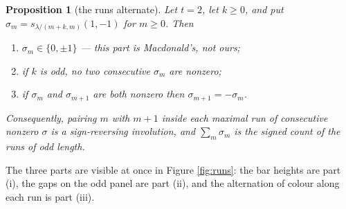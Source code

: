 \documentclass[11pt,reqno]{amsart}
\theoremstyle{plain}
\newtheorem{proposition}[theorem]{Proposition}
\theoremstyle{definition}
\begin{document}
\begin{proposition}[the runs alternate]\label{rem:involution}
Let $t=2$, let $k\ge0$, and put $\sigma_m=s_{\lambda/(m+k,m)}(1,-1)$ for $m\ge0$. Then
\begin{enumerate}
\item[\rm(i)] $\sigma_m\in\{0,\pm1\}$ --- this part is Macdonald's, not ours;
\item[\rm(ii)] if $k$ is odd, no two consecutive $\sigma_m$ are nonzero;
\item[\rm(iii)] if $\sigma_m$ and $\sigma_{m+1}$ are both nonzero then $\sigma_{m+1}=-\sigma_m$.
\end{enumerate}
Consequently, pairing $m$ with $m+1$ inside each maximal run of consecutive nonzero $\sigma$ is a
sign-reversing involution, and $\sum_m\sigma_m$ is the signed count of the runs of odd length.
\end{proposition}

The three parts are visible at once in Figure \ref{fig:runs}: the bar heights are part {\rm(i)}, the
gaps on the odd panel are part {\rm(ii)}, and the alternation of colour along each run is part
{\rm(iii)}.
\end{document}
